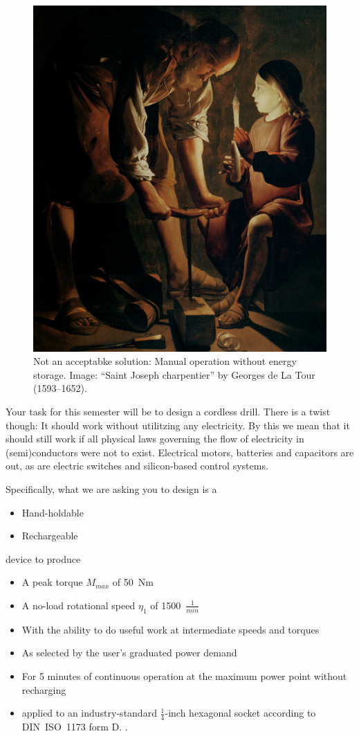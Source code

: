 \documentclass[headinclude=true]{scrartcl}
\begin{document}
\begin{figure}[h!] \centering
 \includegraphics[width=0.5\linewidth]{La_Tour}
 \caption{Not an acceptabke solution: Manual operation without energy storage. Image: ``Saint Joseph charpentier'' by Georges de La Tour (1593–1652).}
\end{figure}


Your task for this semester will be to design a cordless drill. There is a twist though: It should work without utilitzing any electricity. By this we mean that it should still work if all physical laws governing the flow of electricity in (semi)conductors were not to exist. Electrical motors, batteries and capacitors are out, as are electric switches and silicon-based control systems.

Specifically, what we are asking you to design is a

\begin{itemize}
 \item Hand-holdable
 \item Rechargeable
\end{itemize}

device to produce

\begin{itemize}
 \item A peak torque $M_{max}$ of 50~Nm
 \item A no-load rotational speed $\eta_1$ of 1500~$\frac{1}{min}$
 \item With the ability to do useful work at intermediate speeds and torques
 \item As selected by the user's graduated power demand
 \item For 5 minutes of continuous operation at the maximum power point without recharging
 \item applied to an industry-standard $\frac{1}{4}$-inch hexagonal socket according to DIN~ISO~1173 form D. \cite{DDIN2009}.
\end{itemize}
\end{document}
